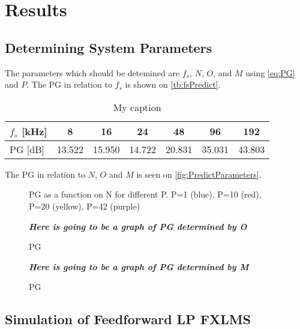 \section{Results}
\subsection{Determining System Parameters}
The parameters which should be detemined are $f_s$, $N$, $O$, and $M$ using \autoref{eq:PG} and $P$.         
The PG in relation to $f_s$ is shown on \autoref{tb:fsPredict}.

\begin{table}[H]
\centering
\begin{tabular}{|l|c|c|c|c|c|c|}
\hline
$f_s$ {[}kHz{]} & 8 & 16 & 24 & 48 & 96 & 192 \\ \hline
PG {[}dB{]} & 13.522 & 15.950 & 14.722 & 20.831 & 35.031 & 43.803 \\ \hline
\end{tabular}
\caption{My caption}
\label{tb:fsPredict}
\end{table}


% 	


The PG in relation to $N$, $O$ and $M$ is seen on \autoref{fig:PredictParameters}. 
\begin{figure}[H]
	\centering
	
	\caption{PG as a function on N for different P. P=1 (blue), P=10 (red), P=20 (yellow), P=42 (purple)}
	\label{fig:PredictN}
\end{figure}
\begin{figure}[H]
	\centering
	\textbf{\textit{Here is going to be a graph of PG determined by O}}
	\caption{PG }
	\label{fig:PredictO}
\end{figure}
\begin{figure}[H]
	\centering
	\textbf{\textit{Here is going to be a graph of PG determined by M}}
	\caption{PG }
	\label{fig:PredictM}
\end{figure}

\subsection{Simulation of Feedforward LP FXLMS}

